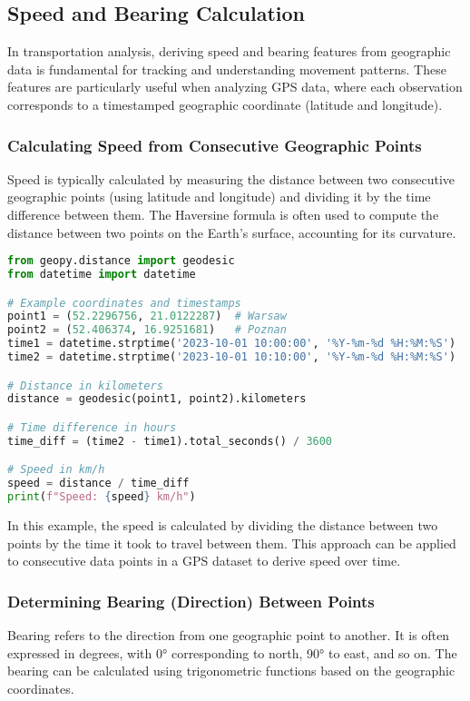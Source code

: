 \documentclass{article}
\begin{document}
\subsection{Speed and Bearing Calculation}
In transportation analysis, deriving speed and bearing features from geographic data is fundamental for tracking and understanding movement patterns. These features are particularly useful when analyzing GPS data, where each observation corresponds to a timestamped geographic coordinate (latitude and longitude).

\subsubsection{Calculating Speed from Consecutive Geographic Points}
Speed is typically calculated by measuring the distance between two consecutive geographic points (using latitude and longitude) and dividing it by the time difference between them. The Haversine formula is often used to compute the distance between two points on the Earth’s surface, accounting for its curvature.

\begin{lstlisting}[language=Python]
from geopy.distance import geodesic
from datetime import datetime

# Example coordinates and timestamps
point1 = (52.2296756, 21.0122287)  # Warsaw
point2 = (52.406374, 16.9251681)   # Poznan
time1 = datetime.strptime('2023-10-01 10:00:00', '%Y-%m-%d %H:%M:%S')
time2 = datetime.strptime('2023-10-01 10:10:00', '%Y-%m-%d %H:%M:%S')

# Distance in kilometers
distance = geodesic(point1, point2).kilometers

# Time difference in hours
time_diff = (time2 - time1).total_seconds() / 3600

# Speed in km/h
speed = distance / time_diff
print(f"Speed: {speed} km/h")
\end{lstlisting}

In this example, the speed is calculated by dividing the distance between two points by the time it took to travel between them. This approach can be applied to consecutive data points in a GPS dataset to derive speed over time.

\subsubsection{Determining Bearing (Direction) Between Points}
Bearing refers to the direction from one geographic point to another. It is often expressed in degrees, with 0° corresponding to north, 90° to east, and so on. The bearing can be calculated using trigonometric functions based on the geographic coordinates.
\end{document}
